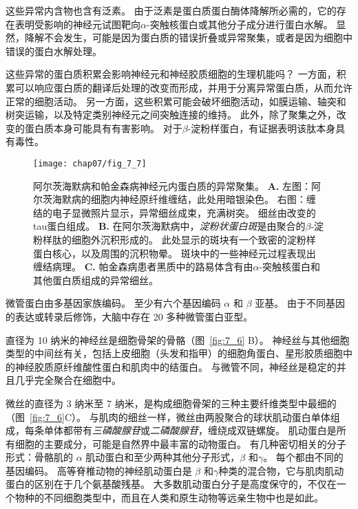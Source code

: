 \begin{proposition}[神经解剖学导航术语]
	\quad \quad 这些异常内含物也含有泛素。
	由于泛素是蛋白质蛋白酶体降解所必需的，它的存在表明受影响的神经元试图靶向$\alpha$-突触核蛋白或其他分子成分进行蛋白水解。
	显然，降解不会发生，可能是因为蛋白质的错误折叠或异常聚集，或者是因为细胞中错误的蛋白水解处理。
	
	\quad \quad 这些异常的蛋白质积累会影响神经元和神经胶质细胞的生理机能吗？
	一方面，积累可以响应蛋白质的翻译后处理的改变而形成，并用于分离异常蛋白质，从而允许正常的细胞活动。
	另一方面，这些积累可能会破坏细胞活动，如膜运输、轴突和树突运输，以及特定类别神经元之间突触连接的维持。
	此外，除了聚集之外，改变的蛋白质本身可能具有有害影响。
	对于$\beta$-淀粉样蛋白，有证据表明该肽本身具有毒性。
	
\end{proposition}


\begin{figure}[htbp]
	\centering
	\texttt{[image: chap07/fig\_7\_7]}
	\caption{阿尔茨海默病和帕金森病神经元内蛋白质的异常聚集。
	\textbf{A.} 左图：阿尔茨海默病的细胞内神经原纤维缠结，此处用暗银染色。
	右图：缠结的电子显微照片显示，异常细丝成束，充满树突。
	细丝由改变的tau蛋白组成。
	\textbf{B.} 在阿尔茨海默病中，\textit{淀粉状蛋白斑}是由聚合的$\beta$-淀粉样肽的细胞外沉积形成的。
	此处显示的斑块有一个致密的淀粉样蛋白核心，以及周围的沉积物晕。
	斑块中的一些神经元过程表现出缠结病理。
	\textbf{C.} 帕金森病患者黑质中的路易体含有由$\alpha$-突触核蛋白和其他蛋白质组成的异常细丝。}
	\label{fig:7_7}
\end{figure}


微管蛋白由多基因家族编码。
至少有六个基因编码 $\alpha$ 和 $\beta$ 亚基。
由于不同基因的表达或转录后修饰，大脑中存在 20 多种微管蛋白亚型。


直径为 10 纳米的神经丝是细胞骨架的骨骼（图~\ref{fig:7_6} B）。
神经丝与其他细胞类型的中间丝有关，包括上皮细胞（头发和指甲）的细胞角蛋白、星形胶质细胞中的神经胶质原纤维酸性蛋白和肌肉中的结蛋白。
与微管不同，神经丝是稳定的并且几乎完全聚合在细胞中。


微丝的直径为 3 纳米至 7 纳米，是构成细胞骨架的三种主要纤维类型中最细的（图~\ref{fig:7_6}C）。
与肌肉的细丝一样，微丝由两股聚合的球状肌动蛋白单体组成，每条单体都带有\textit{三磷酸腺苷}或\textit{二磷酸腺苷}，缠绕成双链螺旋。
肌动蛋白是所有细胞的主要成分，可能是自然界中最丰富的动物蛋白。
有几种密切相关的分子形式：骨骼肌的 $\alpha$ 肌动蛋白和至少两种其他分子形式，$\beta$ 和$\gamma$。
每个都由不同的基因编码。
高等脊椎动物的神经肌动蛋白是 $\beta$ 和$\gamma$种类的混合物，它与肌肉肌动蛋白的区别在于几个氨基酸残基。 
大多数肌动蛋白分子是高度保守的，不仅在一个物种的不同细胞类型中，而且在人类和原生动物等远亲生物中也是如此。



